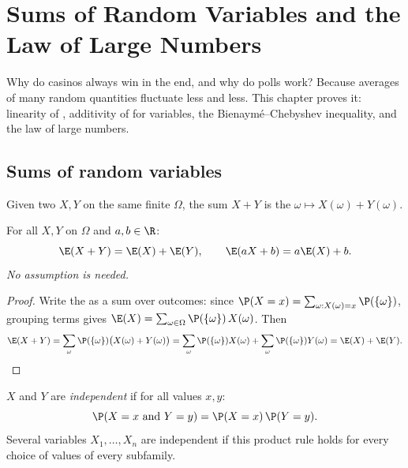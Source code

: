 \chapter{Sums of Random Variables and the Law of Large Numbers}\label{ch:g12:sums}

Why do casinos always win in the end, and why do polls work? Because
averages of many  random quantities fluctuate less and less. This
chapter proves it: linearity of , additivity of  for
 variables, the Bienaymé--Chebyshev inequality, and the law of
large numbers.

\section{Sums of random variables}

Given two  $X, Y$ on the same finite 
$\Omega$, the sum $X + Y$ is the 
$\omega \mapsto X(\omega) + Y(\omega)$.

\begin{theorem}\label{thm:g12:sums:linearity}
For all  $X, Y$ on $\Omega$ and $a, b \in \R$:
\[
\E(X + Y) = \E(X) + \E(Y), \qquad \E(aX + b) = a\E(X) + b .
\]
\emph{No  assumption is needed.}
\end{theorem}

\begin{proof}
Write the  as a sum over outcomes: since
$\P(X = x) = \sum_{\omega : X(\omega) = x} \P(\{\omega\})$, grouping terms
gives $\E(X) = \sum_{\omega \in \Omega} \P(\{\omega\})\,X(\omega)$. Then
\[
\E(X + Y) = \sum_{\omega} \P(\{\omega\})\bigl(X(\omega) + Y(\omega)\bigr)
= \sum_{\omega} \P(\{\omega\})X(\omega)
+ \sum_{\omega} \P(\{\omega\})Y(\omega) = \E(X) + \E(Y). \qedhere
\]
\end{proof}

\begin{definition}\label{def:g12:sums:indep}
$X$ and $Y$ are \emph{independent} if
for all values $x, y$:
\[
\P(X = x \text{ and } Y = y) = \P(X = x)\,\P(Y = y).
\]
Several variables $X_1, \dots, X_n$ are independent if this product rule
holds for every choice of values of every subfamily.
\end{definition}

